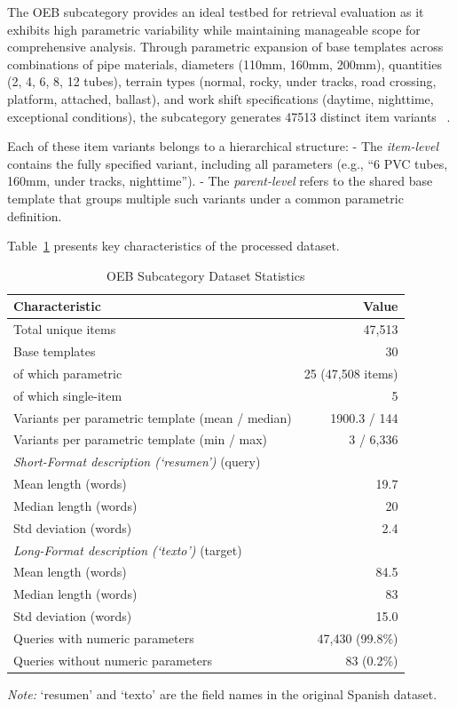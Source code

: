 \documentclass[preprint,12pt]{elsarticle}
\begin{document}
The OEB subcategory provides an ideal testbed for retrieval evaluation as it exhibits high parametric variability while maintaining manageable scope for comprehensive analysis. Through parametric expansion of base templates across combinations of pipe materials, diameters (110mm, 160mm, 200mm), quantities (2, 4, 6, 8, 12 tubes), terrain types (normal, rocky, under tracks, road crossing, platform, attached, ballast), and work shift specifications (daytime, nighttime, exceptional conditions), the subcategory generates 47513 distinct item variants ~\cite{bc3cat_dataset}.

Each of these item variants belongs to a hierarchical structure:  
- The \emph{item-level} contains the fully specified variant, including all parameters (e.g., “6 PVC tubes, 160mm, under tracks, nighttime”).  
- The \emph{parent-level} refers to the shared base template that groups multiple such variants under a common parametric definition.

Table~\ref{tab:dataset_statistics} presents key characteristics of the processed dataset.

\begin{table}[ht]
\centering
\caption{OEB Subcategory Dataset Statistics}
\label{tab:dataset_statistics}
\begin{tabular}{|l|r|}
\hline
\textbf{Characteristic} & \textbf{Value} \\
\hline
Total unique items & 47,513 \\
Base templates & 30 \\
\quad of which parametric & 25 (47,508 items) \\
\quad of which single-item & 5 \\
Variants per parametric template (mean / median) & 1900.3 / 144 \\
Variants per parametric template (min / max) & 3 / 6,336 \\
\hline
\textit{Short-Format description (`resumen')} (query) & \\
\quad Mean length (words) & 19.7 \\
\quad Median length (words) & 20 \\
\quad Std deviation (words) & 2.4 \\
\hline
\textit{Long-Format description (`texto')} (target) & \\
\quad Mean length (words) & 84.5 \\
\quad Median length (words) & 83 \\
\quad Std deviation (words) & 15.0 \\
\hline
Queries with numeric parameters & 47,430 (99.8\%) \\
Queries without numeric parameters & 83 (0.2\%) \\
\hline
\end{tabular}
\end{table}
\smallskip
\small\textit{Note:} `resumen' and `texto' are the field names in the original Spanish dataset.
\smallskip
\end{document}
